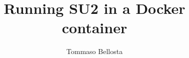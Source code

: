 \documentclass[a4paper, 11 pt]{report}
\begin{document}
\title{\Huge Running SU2 in a Docker container}
\author{Tommaso Bellosta}
\maketitle



\newpage

\end{document}
